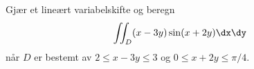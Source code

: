 

Gjær et lineært variabelskifte og beregn
%
\begin{equation*}
  \iint_D (x - 3y) \sin(x + 2y) \dx \dy
\end{equation*}
%
når $D$ er bestemt av $2 \leq x - 3y \leq 3$ og $0 \leq x + 2y \leq \pi/4$.